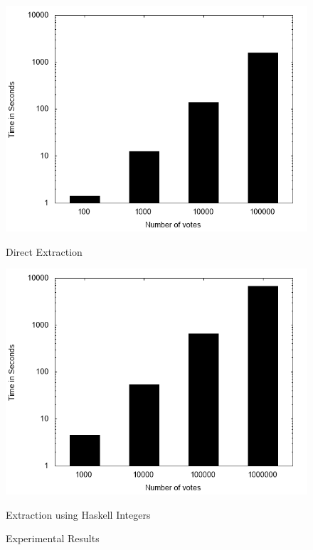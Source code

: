 \begin{figure}
\centering
  {\includegraphics[width=.95\textwidth]{1.png}}
  \caption{Direct Extraction}
  \label{fig:straight}
\end{figure}
\begin{figure}
  \centering
  {\includegraphics[width=.95\textwidth]{2.png}}
  \caption{Extraction using Haskell Integers}
  \label{fig:native}
\caption{Experimental Results}
\end{figure}
  
